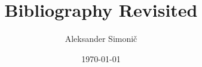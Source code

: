 \documentclass[11pt]{amsart}
\title[Bibliography Revisited]
{ Bibliography Revisited }
\author{ Aleksander Simoni\v{c} }
\date{ \today }
\begin{document}
\maketitle
\nocite{*}


\end{document}
